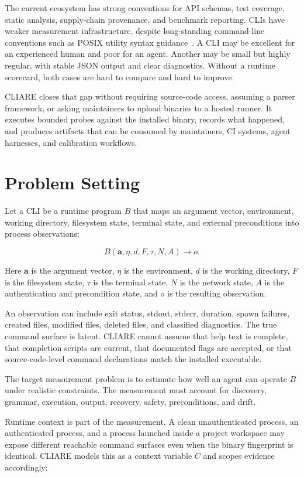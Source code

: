 \documentclass[11pt]{article}
\begin{document}
The current ecosystem has strong conventions for API schemas, test coverage, static analysis, supply-chain provenance, and benchmark reporting. CLIs have weaker measurement infrastructure, despite long-standing command-line conventions such as POSIX utility syntax guidance~\cite{posix-utility}. A CLI may be excellent for an experienced human and poor for an agent. Another may be small but highly regular, with stable JSON output and clear diagnostics. Without a runtime scorecard, both cases are hard to compare and hard to improve.

CLIARE closes that gap without requiring source-code access, assuming a parser framework, or asking maintainers to upload binaries to a hosted runner. It executes bounded probes against the installed binary, records what happened, and produces artifacts that can be consumed by maintainers, CI systems, agent harnesses, and calibration workflows.

\section{Problem Setting}

Let a CLI be a runtime program \(B\) that maps an argument vector, environment, working directory, filesystem state, terminal state, and external preconditions into process observations:

\[
B(\mathbf{a}, \eta, d, F, \tau, N, A) \rightarrow o .
\]

Here \(\mathbf{a}\) is the argument vector, \(\eta\) is the environment, \(d\) is the working directory, \(F\) is the filesystem state, \(\tau\) is the terminal state, \(N\) is the network state, \(A\) is the authentication and precondition state, and \(o\) is the resulting observation.

An observation can include exit status, stdout, stderr, duration, spawn failures, created files, modified files, deleted files, and classified diagnostics. The true command surface is latent. CLIARE cannot assume that help text is complete, that completion scripts are current, that documented flags are accepted, or that source-code-level command declarations match the installed executable.

The target measurement problem is to estimate how well an agent can operate \(B\) under realistic constraints. The measurement must account for discovery, grammar, execution, output, recovery, safety, preconditions, and drift.

Runtime context is part of the measurement. A clean unauthenticated process, an authenticated process, and a process launched inside a project workspace may expose different reachable command surfaces even when the binary fingerprint is identical. CLIARE models this as a context variable \(C\) and scopes evidence accordingly:
\end{document}

